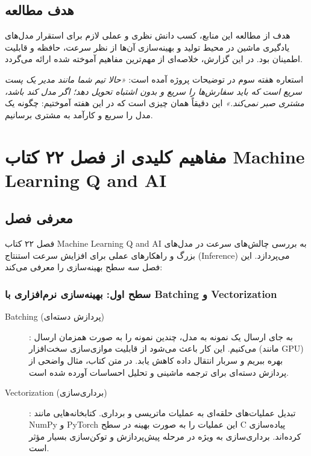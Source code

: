 \documentclass[12pt,a4paper]{report}
\newcommand{\eng}[1]{\textenglish{#1}}
\begin{document}
	\section{هدف مطالعه}
	هدف از مطالعه این منابع، کسب دانش نظری و عملی لازم برای استقرار مدل‌های یادگیری ماشین در محیط تولید و بهینه‌سازی آن‌ها از نظر سرعت، حافظه و قابلیت اطمینان بود. در این گزارش، خلاصه‌ای از مهم‌ترین مفاهیم آموخته شده ارائه می‌گردد.
	
	\begin{infobox}{استعاره هفته سوم}
		در توضیحات پروژه آمده است: \emph{«حالا تیم شما مانند مدیر یک پست سریع است که باید سفارش‌ها را سریع و بدون اشتباه تحویل دهد؛ اگر مدل کند باشد، مشتری صبر نمی‌کند.»} این دقیقاً همان چیزی است که در این هفته آموختیم: چگونه یک مدل را سریع و کارآمد به مشتری برسانیم.
	\end{infobox}
	
	\chapter{مفاهیم کلیدی از فصل ۲۲ کتاب Machine Learning Q and AI}
	
	\section{معرفی فصل}
	فصل ۲۲ کتاب \eng{Machine Learning Q and AI} به بررسی چالش‌های سرعت در مدل‌های بزرگ و راهکارهای عملی برای افزایش سرعت استنتاج (\eng{Inference}) می‌پردازد. این فصل سه سطح بهینه‌سازی را معرفی می‌کند:
	
	\subsection{سطح اول: بهینه‌سازی نرم‌افزاری با Batching و Vectorization}
	\begin{description}
		\item[\eng{Batching} (پردازش دسته‌ای)]: به جای ارسال یک نمونه به مدل، چندین نمونه را به صورت همزمان ارسال می‌کنیم. این کار باعث می‌شود از قابلیت موازی‌سازی سخت‌افزار (مانند \eng{GPU}) بهره ببریم و سربار انتقال داده کاهش یابد. در متن کتاب، مثال واضحی از پردازش دسته‌ای برای ترجمه ماشینی و تحلیل احساسات آورده شده است.
		\item[\eng{Vectorization} (برداری‌سازی)]: تبدیل عملیات‌های حلقه‌ای به عملیات ماتریسی و برداری. کتابخانه‌هایی مانند \eng{NumPy} و \eng{PyTorch} این عملیات را به صورت بهینه در سطح \eng{C} پیاده‌سازی کرده‌اند. برداری‌سازی به ویژه در مرحله پیش‌پردازش و توکن‌سازی بسیار مؤثر است.
	\end{description}
	
\end{document}
